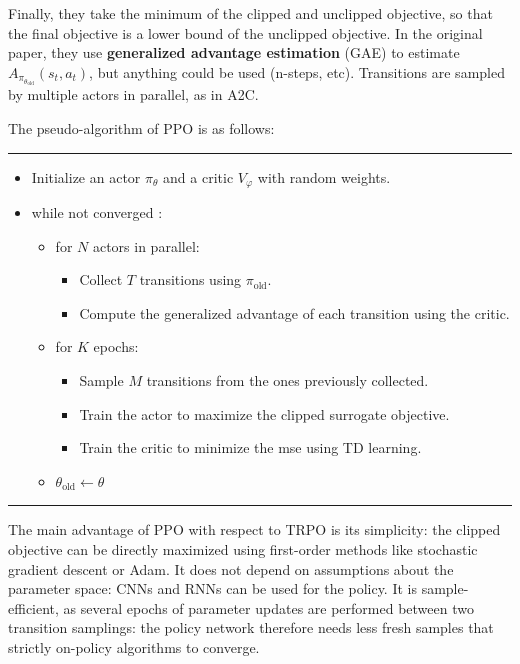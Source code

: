 \documentclass[
  letterpaper,
  DIV=11,
  numbers=noendperiod]{scrreprt}
\begin{document}
Finally, they take the minimum of the clipped and unclipped objective,
so that the final objective is a lower bound of the unclipped objective.
In the original paper, they use \textbf{generalized advantage
estimation} (GAE) to estimate \(A_{\pi_{\theta_\text{old}}}(s_t, a_t)\),
but anything could be used (n-steps, etc). Transitions are sampled by
multiple actors in parallel, as in A2C.

The pseudo-algorithm of PPO is as follows:

\begin{center}\rule{0.5\linewidth}{0.5pt}\end{center}

\begin{itemize}
\item
  Initialize an actor \(\pi_\theta\) and a critic \(V_\varphi\) with
  random weights.
\item
  while not converged :

  \begin{itemize}
  \item
    for \(N\) actors in parallel:

    \begin{itemize}
    \item
      Collect \(T\) transitions using \(\pi_\text{old}\).
    \item
      Compute the generalized advantage of each transition using the
      critic.
    \end{itemize}
  \item
    for \(K\) epochs:

    \begin{itemize}
    \item
      Sample \(M\) transitions from the ones previously collected.
    \item
      Train the actor to maximize the clipped surrogate objective.
    \item
      Train the critic to minimize the mse using TD learning.
    \end{itemize}
  \item
    \(\theta_\text{old} \leftarrow \theta\)
  \end{itemize}
\end{itemize}

\begin{center}\rule{0.5\linewidth}{0.5pt}\end{center}

The main advantage of PPO with respect to TRPO is its simplicity: the
clipped objective can be directly maximized using first-order methods
like stochastic gradient descent or Adam. It does not depend on
assumptions about the parameter space: CNNs and RNNs can be used for the
policy. It is sample-efficient, as several epochs of parameter updates
are performed between two transition samplings: the policy network
therefore needs less fresh samples that strictly on-policy algorithms to
converge.
\end{document}

